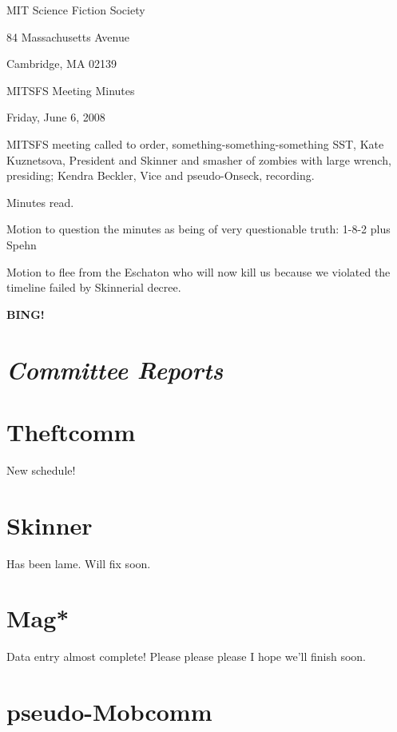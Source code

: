 \documentclass[10pt]{article}
\newcommand{\bing}{{\bf BING!} }
\newcommand{\goto}[1]{\bing \vskip 12pt \section*{{\em{#1}}}}
\newcommand{\ps}{ plus Spehn\xspace}
\begin{document}
\begin{center}

MIT Science Fiction Society

84 Massachusetts Avenue

Cambridge, MA 02139

\vspace{12pt}

MITSFS Meeting Minutes

Friday, June 6, 2008

\end{center}

\vspace{18pt}

\setlength{\parskip}{6pt}

\noindent
MITSFS meeting called to order, something-something-something SST,
Kate Kuznetsova, President and Skinner and smasher of zombies with large wrench, presiding; Kendra Beckler, Vice and pseudo-Onseck, recording.

Minutes read.

Motion to question the minutes as being of very questionable truth: 1-8-2 \ps

Motion to flee from the Eschaton who will now kill us because we violated the timeline failed by Skinnerial decree.

\BING

\goto{Committee Reports}

\section*{Theftcomm}

New schedule!

\section*{Skinner}

Has been lame.  Will fix soon.

\section*{Mag*}

Data entry almost complete!  Please please please I hope we'll finish soon.

\section*{pseudo-Mobcomm}
\end{document}
